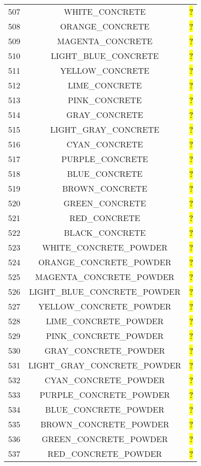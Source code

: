 \documentclass[11pt]{article}
\newcommand\myworries[1]{\sethlcolor{red}\hl{#1}}
\begin{document}
\begin{longtable}{ |c|c|c| }
	507 & WHITE\_CONCRETE & \myworries{?} \\
	508 & ORANGE\_CONCRETE & \myworries{?} \\
	509 & MAGENTA\_CONCRETE & \myworries{?} \\
	510 & LIGHT\_BLUE\_CONCRETE & \myworries{?} \\
	511 & YELLOW\_CONCRETE & \myworries{?} \\
	512 & LIME\_CONCRETE & \myworries{?} \\
	513 & PINK\_CONCRETE & \myworries{?} \\
	514 & GRAY\_CONCRETE & \myworries{?} \\
	515 & LIGHT\_GRAY\_CONCRETE & \myworries{?} \\
	516 & CYAN\_CONCRETE & \myworries{?} \\
	517 & PURPLE\_CONCRETE & \myworries{?} \\
	518 & BLUE\_CONCRETE & \myworries{?} \\
	519 & BROWN\_CONCRETE & \myworries{?} \\
	520 & GREEN\_CONCRETE & \myworries{?} \\
	521 & RED\_CONCRETE & \myworries{?} \\
	522 & BLACK\_CONCRETE & \myworries{?} \\
	523 & WHITE\_CONCRETE\_POWDER & \myworries{?} \\
	524 & ORANGE\_CONCRETE\_POWDER & \myworries{?} \\
	525 & MAGENTA\_CONCRETE\_POWDER & \myworries{?} \\
	526 & LIGHT\_BLUE\_CONCRETE\_POWDER & \myworries{?} \\
	527 & YELLOW\_CONCRETE\_POWDER & \myworries{?} \\
	528 & LIME\_CONCRETE\_POWDER & \myworries{?} \\
	529 & PINK\_CONCRETE\_POWDER & \myworries{?} \\
	530 & GRAY\_CONCRETE\_POWDER & \myworries{?} \\
	531 & LIGHT\_GRAY\_CONCRETE\_POWDER & \myworries{?} \\
	532 & CYAN\_CONCRETE\_POWDER & \myworries{?} \\
	533 & PURPLE\_CONCRETE\_POWDER & \myworries{?} \\
	534 & BLUE\_CONCRETE\_POWDER & \myworries{?} \\
	535 & BROWN\_CONCRETE\_POWDER & \myworries{?} \\
	536 & GREEN\_CONCRETE\_POWDER & \myworries{?} \\
	537 & RED\_CONCRETE\_POWDER & \myworries{?} \\

\end{longtable}
\end{document}

